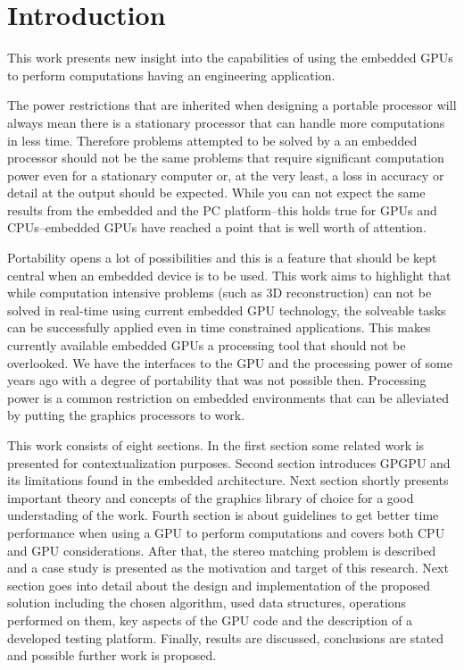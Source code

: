 \documentclass[conference]{IEEEtran}
\begin{document}

\section{Introduction}
This work presents new insight into the capabilities of using the embedded GPUs to perform computations having an engineering application.

The power restrictions that are inherited when designing a portable processor will always mean there is a stationary processor that can handle more computations in less time. Therefore problems attempted to be solved by a an embedded processor should not be the same problems that require significant computation power even for a stationary computer or, at the very least, a loss in accuracy or detail at the output should be expected. While you can not expect the same results from the embedded and the PC platform--this holds true for GPUs and CPUs--embedded GPUs have reached a point that is well worth of attention.

Portability opens a lot of possibilities and this is a feature that should be kept central when an embedded device is to be used. This work aims to highlight that while computation intensive problems (such as 3D reconstruction) can not be solved in real-time using current embedded GPU technology, the solveable tasks can be successfully applied even in time constrained applications. This makes currently available embedded GPUs a processing tool that should not be overlooked. We have the interfaces to the GPU and the processing power of some years ago with a degree of portability that was not possible then. Processing power is a common restriction on embedded environments that can be alleviated by putting the graphics processors to work.

This work consists of eight sections. In the first section some related work is presented for contextualization purposes. Second section introduces GPGPU and its limitations found in the embedded architecture. Next section shortly presents important theory and concepts of the graphics library of choice for a good understading of the work. Fourth section is about guidelines to get better time performance when using a GPU to perform computations and covers both CPU and GPU considerations. After that, the stereo matching problem is described and a case study is presented as the motivation and target of this research. Next section goes into detail about the design and implementation of the proposed solution including the chosen algorithm, used data structures, operations performed on them, key aspects of the GPU code and the description of a developed testing platform. Finally, results are discussed, conclusions are stated and possible further work is proposed.
\end{document}
